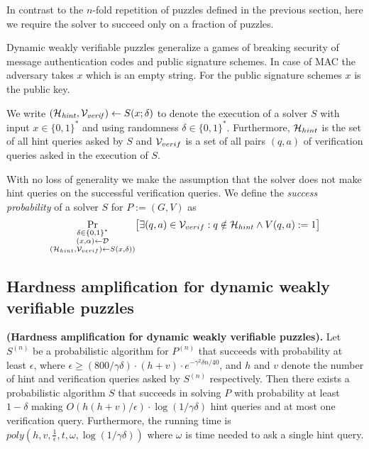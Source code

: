 In contrast to the $n$-fold repetition of puzzles defined in the previous section, here we
require the solver to succeed only on a fraction of puzzles.

Dynamic weakly verifiable puzzles generalize a games of breaking security of message authentication codes and public signature schemes.
In case of MAC the adversary takes $x$ which is an empty string. For the public signature schemes $x$ is the public key.

We write $(\mathcal{H}_{\mathit{hint}}, \mathcal{V}_{\mathit{verif}}) \leftarrow S(x; \delta)$
to denote the execution of a solver $S$ with input $x \in \{0,1\}^{*}$ and using randomness $\delta \in \{0,1\}^{*}$.
Furthermore, $\mathcal{H}_{hint}$ is the set of all hint queries asked by $S$ and $\mathcal{V}_{verif}$ is
a set of all pairs $(q,a)$ of verification queries asked in the execution of $S$.

With no loss of generality we make the assumption that the solver does not make
hint queries on the successful verification queries.
We define the \textit{success probability} of a solver $S$ for $P := (G,V)$ as
\begin{align*}
  \underset{\substack{\delta \in \{0,1\}^{*} \\(x,\alpha) \leftarrow \mathcal{D} \\ (\mathcal{H}_{hint}, \mathcal{V}_{verif}) \leftarrow S(x,\delta))}}
  {\Pr}\big[\exists (q,a) \in \mathcal{V}_{verif} : q \notin \mathcal{H}_{hint} \land V(q,a) := 1 \big]
\end{align*}

\subsection{Hardness amplification for dynamic weakly verifiable puzzles}
\begin{theorem}\textbf{(Hardness amplification for dynamic weakly verifiable puzzles).}
\label{lemma:dwvp}
Let $S^{(n)}$ be a probabilistic algorithm for $P^{(n)}$ that succeeds with
probability at least $\epsilon$, where $\epsilon \geq (800/\gamma\delta) \cdot (h+v) \cdot e^{-\gamma^2\delta n/40}$, and $h$ and $v$
denote the number of hint and verification queries asked by $S^{(n)}$ respectively.
Then there exists a probabilistic algorithm $S$ that succeeds in solving $P$ with probability at least
$1-\delta$ making $O(h(h+v)/\epsilon) \cdot \log(1/\gamma\delta)$ hint queries and at most one verification query.
Furthermore, the running time is $\mathit{poly}(h,v,\frac{1}{\epsilon}, t, \omega, \log(1/\gamma\delta))$ where
$\omega$ is time needed to ask a single hint query.
\end{theorem}

